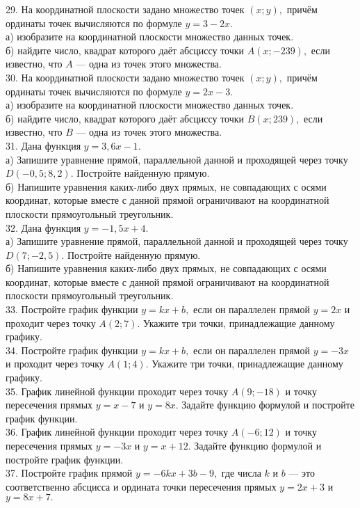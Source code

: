 29. На координатной плоскости задано множество точек $(x;y),$ причём ординаты точек вычисляются по формуле $y=3-2x.$\\
а) изобразите на координатной плоскости множество данных точек.\\
б) найдите число, квадрат которого даёт абсциссу точки $A(x;-239),$ если известно, что $A$ --- одна из точек этого множества.\\
30. На координатной плоскости задано множество точек $(x;y),$ причём ординаты точек вычисляются по формуле $y=2x-3.$\\
а) изобразите на координатной плоскости множество данных точек.\\
б) найдите число, квадрат которого даёт абсциссу точки $B(x;239),$ если известно, что $B$ --- одна из точек этого множества.\\
31. Дана функция $y=3,6x-1.$\\
а) Запишите уравнение прямой, параллельной данной и проходящей через точку $D(-0,5;8,2).$ Постройте найденную прямую.\\
б) Напишите уравнения каких-либо двух прямых, не совпадающих с осями координат, которые вместе с данной прямой ограничивают на координатной плоскости прямоугольный треугольник.\\
32. Дана функция $y=-1,5x+4.$\\
а) Запишите уравнение прямой, параллельной данной и проходящей через точку $D(7;-2,5).$ Постройте найденную прямую.\\
б) Напишите уравнения каких-либо двух прямых, не совпадающих с осями координат, которые вместе с данной прямой ограничивают на координатной плоскости прямоугольный треугольник.\\
33. Постройте график функции $y=kx+b,$ если он параллелен прямой $y=2x$ и проходит через точку $A(2;7).$ Укажите три точки, принадлежащие данному графику.\\
34. Постройте график функции $y=kx+b,$ если он параллелен прямой $y=-3x$ и проходит через точку $A(1;4).$ Укажите три точки, принадлежащие данному графику.\\
35. График линейной функции проходит через точку $A(9;-18)$ и точку пересечения прямых $y=x-7$ и $y=8x.$ Задайте функцию формулой и постройте график функции.\\
36. График линейной функции проходит через точку $A(-6;12)$ и точку пересечения прямых $y=-3x$ и $y=x+12.$ Задайте функцию формулой и постройте график функции.\\
37. Постройте график прямой $y=-6kx+3b-9,$ где числа $k$ и $b$ --- это соответственно абсцисса и ордината точки пересечения прямых $y=2x+3$ и $y=8x+7.$\\
